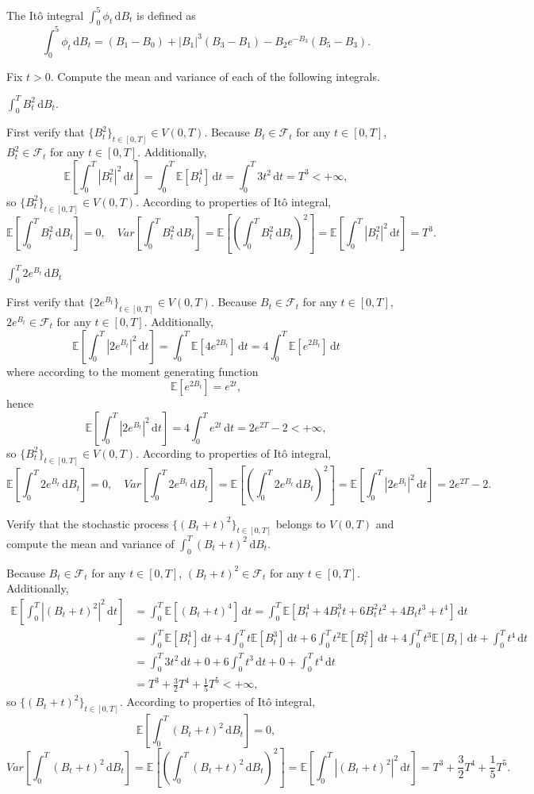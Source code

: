 \documentclass{MFM-hw} %
\newcommand{\dd}{\,\mathrm{d}}
\newcommand{\EE}{\mathbb{E}}
\begin{document}
The Itô integral $\int_0^5 \phi_t \dd B_t$ is defined as
\[
    \int_0^5 \phi_t \dd B_t = (B_1 - B_0) + |B_1|^3 (B_3 - B_1) - B_2 e^{-B_3}(B_5-B_3).
\]

\HWproblem
Fix $t>0$. Compute the mean and variance of each of the following integrals.

\HWsubproblem
$\int_0^{T} B_t^2 \dd B_t$.

First verify that $\{B_{t}^2\}_{t\in[0,T]} \in V(0,T)$. Because $B_t \in \mathcal{F}_t$ for any $t \in [0,T]$, $B_t^2 \in \mathcal{F}_t$ for any $t \in [0,T]$. Additionally, 
\[
    \EE[\int_0^T |B_t^2|^2 \dd t] = \int_0^T \EE[B_t^4]\dd t = \int_0^{T} 3t^2 \dd t = T^3 < +\infty,
\]
so $\{B_{t}^2\}_{t\in[0,T]} \in V(0,T)$. According to properties of Itô integral,
\[
    \EE[\int_0^{T} B_t^2 \dd B_t] = 0, \quad Var[\int_0^{T} B_t^2 \dd B_t] = \EE[(\int_0^{T} B_t^2 \dd B_t)^2] = \EE[\int_0^T |B_t^2|^2 \dd t] = T^3.
\]

\HWsubproblem
$\int_0^{T} 2e^{B_t} \dd B_t$

First verify that $\{2e^{B_t}\}_{t\in[0,T]} \in V(0,T)$. Because $B_t \in \mathcal{F}_t$ for any $t \in [0,T]$, $2e^{B_t} \in \mathcal{F}_t$ for any $t \in [0,T]$. Additionally, 
\[
    \EE[\int_0^T |2e^{B_t}|^2 \dd t] = \int_0^T \EE[4e^{2B_t}]\dd t = 4\int_0^{T} \EE[e^{2B_t}]\dd t
\]
where according to the moment generating function
\[
    \EE[e^{2B_t}] = e^{2t},
\]
hence
\[
    \EE[\int_0^T |2e^{B_t}|^2 \dd t] = 4\int_0^{T} e^{2t} \dd t = 2e^{2T} - 2 < +\infty,
\]
so $\{B_{t}^2\}_{t\in[0,T]} \in V(0,T)$. According to properties of Itô integral,
\[
    \EE[\int_0^{T} 2e^{B_t} \dd B_t] = 0, \quad Var[\int_0^{T}2e^{B_t} \dd B_t] = \EE[(\int_0^{T} 2e^{B_t} \dd B_t)^2] = \EE[\int_0^T |2e^{B_t}|^2 \dd t] = 2e^{2T} - 2.
\]

\HWproblem
Verify that the stochastic process $\{(B_t+t)^2\}_{t \in [0,T]}$ belongs to $V(0,T)$ and compute the mean and variance of $\int_0^{T}(B_t + t)^2 \dd B_t$.

Because $B_t \in \mathcal{F}_t$ for any $t \in [0,T]$, $(B_t+t)^2 \in \mathcal{F}_t$ for any $t \in [0,T]$. Additionally,
\begin{align*}
    \EE[\int_0^T |(B_t+t)^2|^2 \dd t] &= \int_0^T \EE[(B_t+t)^4]\dd t = \int_0^T \EE[B_t^4+4B_t^3t + 6B_t^2t^2 + 4B_t t^3 + t^4]\dd t \\
    & = \int_0^T \EE[B_t^4]\dd t + 4\int_0^T t\EE[B_t^3]\dd t + 6\int_0^T t^2\EE[B_t^2]\dd t + 4\int_0^T t^3 \EE[B_t]\dd t + \int_0^T t^4\dd t\\
    & = \int_0^{T} 3t^2\dd t + 0 + 6\int_0^{T} t^3 \dd t + 0 + \int_0^{T} t^4 \dd t \\
    & = T^3 + \frac32 T^4 + \frac15 T^5 < +\infty,
\end{align*}
so  $\{(B_t+t)^2\}_{t \in [0,T]}$. According to properties of Itô integral,
\[
    \EE[\int_0^{T} (B_t+t)^2 \dd B_t] = 0,
\]
\[
Var[\int_0^{T} (B_t+t)^2 \dd B_t] = \EE[(\int_0^{T} (B_t+t)^2 \dd B_t)^2] = \EE[\int_0^T |(B_t+t)^2|^2 \dd t] = T^3 + \frac32 T^4 + \frac15 T^5.
\]
\end{document}
